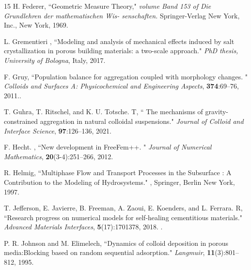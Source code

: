 \documentclass[reqno, 11pt]{amsart}
\numberwithin{equation}{section}
\begin{document}
\begin{thebibliography}{15}
\newblock H. Federer,
\newblock  ``Geometric Measure Theory,"
\newblock   \emph{volume Band 153 of Die Grundlehren der mathematischen Wis-
senschaften. }  \textbf{}Springer-Verlag New York, Inc., New York, 1969. 


\newblock L. Grementieri ,
\newblock  ``Modeling and analysis of mechanical effects induced by salt crystallization in porous building
materials: a two-scale approach."
\newblock   \emph{PhD thesis, University of Bologna},  \textbf{} Italy, 2017. 

\newblock F. Gruy,
\newblock  ``Population balance for aggregation coupled with morphology changes.  "
\newblock   \emph{Colloids and Surfaces A:
Physicochemical and Engineering Aspects},  \textbf{374}:69–76, 2011..

\newblock T. Guhra, T. Ritschel, and K. U. Totsche. T,
\newblock  `` The mechanisms of gravity-constrained aggregation in natural
colloidal suspensions."
\newblock   \emph{Journal of Colloid and Interface Science},  \textbf{97}:126–136, 2021.


\newblock F. Hecht. ,
\newblock  ``New development in FreeFem++.  "
\newblock   \emph{Journal of Numerical Mathematics},  \textbf{20}(3-4):251–266, 2012. 

\newblock R. Helmig,
\newblock  ``Multiphase Flow and Transport Processes in the Subsurface : A Contribution to the Modeling
of Hydrosystems."
\newblock   \emph{},  \textbf{}Springer, Berlin New York, 1997. 

\newblock T. Jefferson, E. Javierre, B. Freeman, A. Zaoui, E. Koenders, and L. Ferrara. R,
\newblock  ``Research progress on numerical
models for self-healing cementitious materials."
\newblock   \emph{Advanced Materials Interfaces},  \textbf{5}(17):1701378, 2018. .

\newblock P. R. Johnson and M. Elimelech,
\newblock ``Dynamics of colloid deposition in porous media:Blocking based on
random sequential adsorption."
\newblock   \emph{Langmuir},  \textbf{11}(3):801–812, 1995.


\end{thebibliography}
\end{document}

